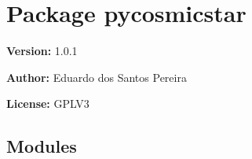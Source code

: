 %
%
%


\section{Package pycosmicstar}

    \label{pycosmicstar}
\textbf{Version:} 1.0.1



\textbf{Author:} Eduardo dos Santos Pereira



\textbf{License:} GPLV3





\subsection{Modules}

